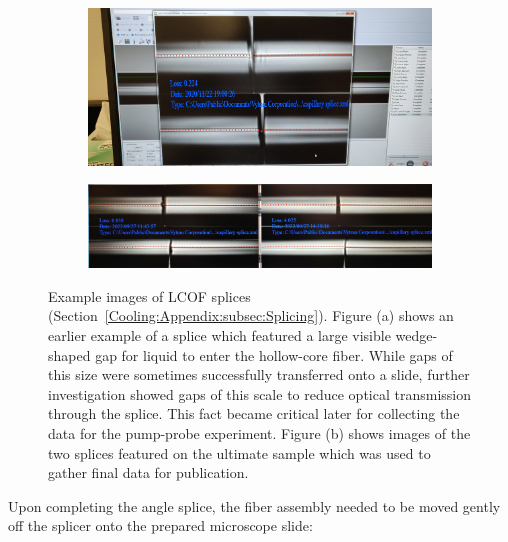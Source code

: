 \begin{figure}[t]
    \centering
    \begin{subfigure}[b]{\textwidth}
        \centering
        \includegraphics[width=\textwidth]{figs/3-Cooling/bigGapSplice.jpg}
        \caption{}
        \label{fig:Cooling:big gap splice}
    \end{subfigure}
    \vspace{0.5cm}
    \begin{subfigure}[b]{\textwidth}
        \centering
        \includegraphics[width=\textwidth]{figs/3-Cooling/finalSampleVytranSplice.jpeg}
        \caption{}
        \label{fig:Cooling:final splice used for data}
    \end{subfigure}
    \caption{Example images of \ac{LCOF} splices (Section~\ref{Cooling:Appendix:subsec:Splicing}). Figure (a) shows an earlier example of a splice which featured a large visible wedge-shaped gap for liquid to enter the hollow-core fiber. While gaps of this size were sometimes successfully transferred onto a slide, further investigation showed gaps of this scale to reduce optical transmission through the splice. This fact became critical later for collecting the data for the pump-probe experiment. Figure (b) shows images of the two splices featured on the ultimate sample which was used to gather final data for publication.}
    \label{fig:Cooling:example splice images}
\end{figure}

\FloatBarrier

Upon completing the angle splice, the fiber assembly needed to be moved gently off the splicer onto the prepared microscope slide:

